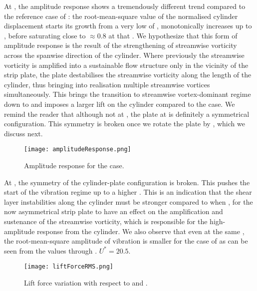 \documentclass[a4paper]{article}
\begin{document}
At \ptlt{}\es{}\rze{}, the amplitude response shows a tremendously different trend compared to the reference case of \ptlt{}\es{}\rfo{}: the root-mean-square value of the normalised cylinder displacement \yrms{} starts its growth from a very low \ured{} of \urfo{}, monotonically increases up to \ured{}\es{}\urei{}, before saturating close to \yrms{}$\approx 0.8$ at that \ured{}. We hypothesize that this form of amplitude response is  the result of the strengthening of streamwise vorticity across the spanwise direction of the cylinder. Where previously the streamwise vorticity is amplified into a sustainable flow structure only in the vicinity of the strip plate, the \rze{} plate destabilises the streamwise vorticity along the length of the cylinder, thus bringing into realisation multiple streamwise vortices simultaneously. This brings the transition to streamwise vortex-dominant regime down to \ured{}\es{}\urfo{} and imposes a larger lift on the cylinder compared to the \rfo{} case. We remind the reader that although not at \rfo{}, the plate at \rze{} is definitely a symmetrical configuration. This symmetry is broken once we rotate the plate by \ron{}, which we discuss next.

\begin{figure}[h]
  \centering
  \texttt{[image: amplitudeResponse.png]}
  \caption{Amplitude response for the \rze{} case.}
  \label{fig:ampresp}
\end{figure}

At \ptlt{}\es{}\ron{}, the symmetry of the cylinder-plate configuration is broken. This pushes the start of the vibration regime up to a higher \ured{}\es{}\urni{}. This is an indication that the shear layer instabilities along the cylinder must be stronger compared to when \ptlt{}\es{}\rze{}, for the now asymmetrical strip plate to have an effect on the amplification and sustenance of the streamwise vorticity, which is responsible for the high-amplitude response from the cylinder. We also observe that even at the same \ured{}, the root-mean-square amplitude of vibration is smaller for the case of \ron{} as can be seen from the \yrms{} values \ured{} \es{} \urni{} through \urtt{}. $U^{*}=20.5$.

\newpage

\begin{figure}[h]
  \centering
  \texttt{[image: liftForceRMS.png]}
  \caption{Lift force variation with respect to \ured{} and \ptlt{}.}
  \label{fig:liftevo}
\end{figure}
\end{document}
